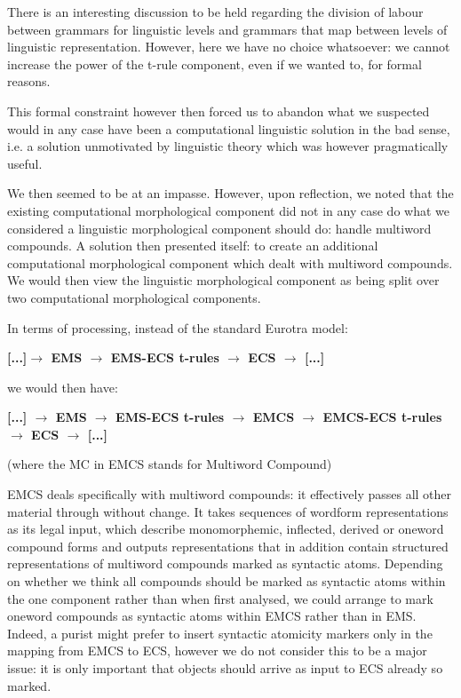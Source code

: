 There  is  an  interesting discussion to be  held  regarding  the 
division  of  labour between grammars for linguistic  levels  and 
grammars  that  map between levels of linguistic  representation. 
However,  here we have no choice whatsoever:  we cannot  increase 
the  power  of the t-rule component,  even if we wanted  to,  for 
formal reasons.

This formal constraint however then forced us to abandon what  we 
suspected would in any case have been a computational  linguistic 
solution  in  the  bad sense,  i.e.  a  solution  unmotivated  by 
linguistic   theory  which  was  however  pragmatically   useful.

We then seemed to be at an impasse.  However, upon reflection, we 
noted that the existing computational morphological component did 
not in any case do what we considered a linguistic  morphological 
component should do:  handle multiword compounds. A solution then 
presented   itself:   to   create  an  additional   computational 
morphological component which dealt with multiword compounds.  We 
would  then view the linguistic morphological component as  being 
split over two computational morphological components.

In terms of processing, instead of the standard Eurotra model:

\begin{center}

{\bf [...]$\rightarrow$  EMS  $\rightarrow$   EMS-ECS t-rules $\rightarrow$ ECS $\rightarrow$ [...]}
\end{center}

we would then have:

\begin{center}
{\bf [...]  $\rightarrow$ EMS $\rightarrow$  EMS-ECS t-rules $\rightarrow$ EMCS $\rightarrow$ EMCS-ECS t-rules  $\rightarrow$ 
ECS $\rightarrow$  [...]}
\end{center}


(where the MC in EMCS stands for Multiword Compound)

EMCS deals specifically with multiword compounds:  it effectively 
passes  all  other  material through  without  change.  It  takes 
sequences  of wordform representations as its legal input,  which 
describe monomorphemic,  inflected,  derived or oneword  compound 
forms  and  outputs  representations  that  in  addition  contain 
structured  representations  of  multiword  compounds  marked  as 
syntactic  atoms.  Depending  on whether we think  all  compounds 
should  be  marked  as syntactic atoms within the  one  component 
rather than when first analysed, we could arrange to mark oneword 
compounds  as  syntactic atoms within EMCS rather  than  in  EMS. 
Indeed,  a  purist  might  prefer to insert  syntactic  atomicity 
markers only in the mapping from EMCS to ECS,  however we do  not 
consider  this  to be a major issue:  it is only  important  that 
objects should arrive as input to ECS already so marked.

